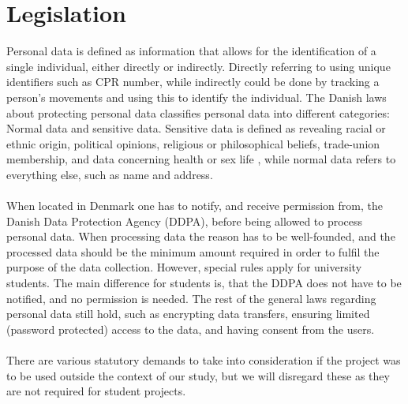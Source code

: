 
\section{Legislation}
\label{sec:legislation}

Personal data is defined as information that allows for the identification of a single individual, either directly or indirectly. Directly referring to using unique identifiers such as CPR number, while indirectly could be done by tracking a person's movements and using this to identify the individual. The Danish laws about protecting personal data classifies personal data into different categories: Normal data and sensitive data. Sensitive data is defined as revealing racial or ethnic origin, political opinions, religious or philosophical beliefs, trade-union membership, and data concerning health or sex life \parencite{datatilsynet_stud1}, while normal data refers to everything else, such as name and address.  
\\\\
When located in Denmark one has to notify, and receive permission from, the Danish Data Protection Agency (DDPA), before being allowed to process personal data. When processing data the reason has to be well-founded, and the processed data should be the minimum amount required in order to fulfil the purpose of the data collection. However, special rules apply for university students. The main difference for students is, that the DDPA does not have to be notified, and no permission is needed. The rest of the general laws regarding personal data still hold, such as encrypting data transfers, ensuring limited (password protected) access to the data, and having consent from the users. 
\\\\
There are various statutory demands to take into consideration if the project was to be used outside the context of our study, but we will disregard these as they are not required for student projects. 




